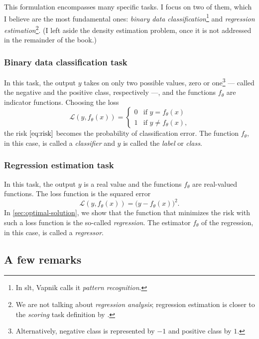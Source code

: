 This formulation encompasses many specific tasks. I focus on two of them, which I
believe are the most fundamental ones: \emph{binary data classification}\footnote{In
\gls{slt}, Vapnik calls it \emph{pattern recognition}.} and \emph{regression
estimation}\footnote{We are not talking about \emph{regression analysis}; regression
estimation is closer to the \emph{scoring} task definition by .}.  (I
left aside the density estimation problem, once it is not addressed in the remainder of
the book.)

\subsubsection{Binary data classification task}

In this task, the output $y$ takes on
only two possible values, zero or one\footnote{Alternatively, negative class is
represented by $-1$ and positive class by $1$.} --- called the negative and the positive
class, respectively ---, and the functions $f_\theta$ are indicator
functions. Choosing the loss
\begin{equation*}
  \mathcal{L}(y, f_\theta(x)) = \begin{cases}
    0 & \text{if } y = f_\theta(x) \\
    1 & \text{if } y \neq f_\theta(x)\text{,}
  \end{cases}
\end{equation*}
the risk $\eqref{eq:risk}$ becomes the probability of
classification error.  The function $f_\theta$, in this case, is called a \emph{classifier}
and $y$ is called the \emph{label} or \emph{class}.

\subsubsection{Regression estimation task}

In this task, the output $y$ is a real value and the functions $f_\theta$ are real-valued
functions.  The loss function is the squared error
\[
  \mathcal{L}(y, f_\theta(x)) = \big(y - f_\theta(x)\big)^2\text{.}
\]
In \cref{sec:optimal-solution}, we show that the function that minimizes the risk with such
a loss function is the so-called \emph{regression}.
The estimator $f_\theta$ of the regression, in this case, is called a \emph{regressor}.

\subsection{A few remarks}

